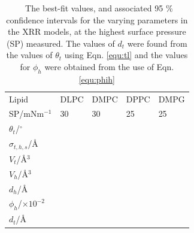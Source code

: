 \documentclass[11pt,a4paper]{paper}
\begin{document}
%
\begin{table}
  \centering
	\caption{\ The best-fit values, and associated 95 \% confidence intervals for the varying parameters in the XRR models, at the highest surface pressure (SP) measured. The values of $d_t$ were found from the values of $\theta_t$ using Eqn. \ref{equ:tl} and the values for $\phi_h$ were obtained from the use of Eqn. \ref{equ:phih}}
	\label{tab:liptab1}
	\begin{tabular}{l|l|l|l|l}
		Lipid & DLPC & DMPC & DPPC & DMPG \\
    SP/mNm$^{-1}$ & 30 & 30 & 25 & 25 \\
		\hline
		$\theta_t$/$^\circ$ &  &  &  &  \\
		$\sigma_{t,h,s}$/\AA &  &  &  &  \\
    \hline
    $V_t$/\AA$^3$ &  &  &  &  \\
		$V_h$/\AA$^3$ &  &  &  &  \\
		$d_h$/\AA &  &  &  &  \\
    \hline
    $\phi_h$/$\times10^{-2}$ &  &  &  &  \\
		$d_t$/\AA &  &  &  &  \\
	\end{tabular}
\end{table}
%
%
\end{document}
